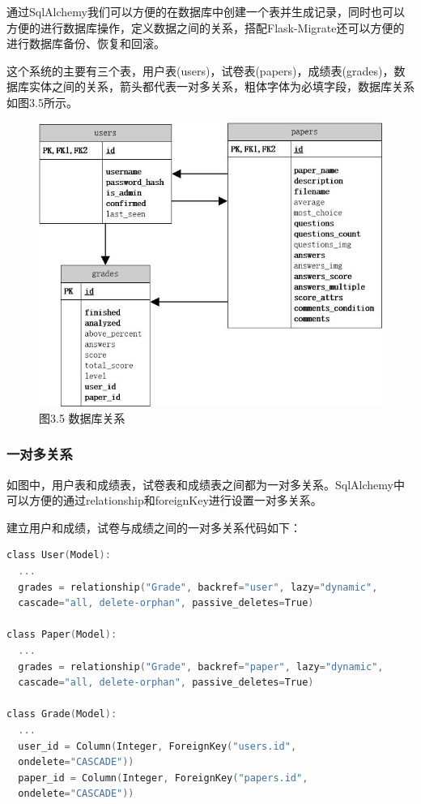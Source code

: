 通过SqlAlchemy我们可以方便的在数据库中创建一个表并生成记录，同时也可以方便的进行数据库操作，定义数据之间的关系，搭配Flask-Migrate还可以方便的进行数据库备份、恢复和回滚。

这个系统的主要有三个表，用户表(users)，试卷表(papers)，成绩表(grades)，数据库实体之间的关系，箭头都代表一对多关系，粗体字体为必填字段，数据库关系如图3.5所示。

\begin{figure}[thbp!]
	\centering
	\includegraphics[width=0.7\linewidth]{figure/entity_relationship}
	\label{fig:entity_relationship} \\
		图3.5 数据库关系
\end{figure}

\subsubsection{一对多关系}

如图中，用户表和成绩表，试卷表和成绩表之间都为一对多关系。SqlAlchemy中可以方便的通过relationship和foreignKey进行设置一对多关系。

建立用户和成绩，试卷与成绩之间的一对多关系代码如下：
\begin{lstlisting}[language=C]
class User(Model):
  ...
  grades = relationship("Grade", backref="user", lazy="dynamic",
  cascade="all, delete-orphan", passive_deletes=True)

class Paper(Model):
  ...
  grades = relationship("Grade", backref="paper", lazy="dynamic",
  cascade="all, delete-orphan", passive_deletes=True)

class Grade(Model):
  ...
  user_id = Column(Integer, ForeignKey("users.id",
  ondelete="CASCADE"))
  paper_id = Column(Integer, ForeignKey("papers.id",
  ondelete="CASCADE"))
\end{lstlisting}

